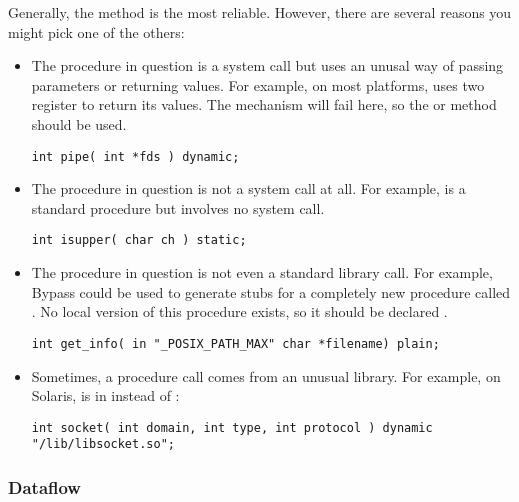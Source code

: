 Generally, the  method is the most reliable.  However, there are several reasons you might pick one of the others:
\begin{itemize}
\item The procedure in question is a system call but uses an unusal way of passing parameters or returning values.  For example, on most platforms,  uses two register to return its values.  The  mechanism will fail here, so the  or  method should be used.
\begin{verbatim}
int pipe( int *fds ) dynamic;
\end{verbatim}
\item The procedure in question is not a system call at all.  For example,  is a standard procedure but involves no system call.
\begin{verbatim}
int isupper( char ch ) static;
\end{verbatim}
\item The procedure in question is not even a standard library call.  For example, Bypass could be used to generate stubs for a completely new procedure called .  No local version of this procedure exists, so it should be declared .
\begin{verbatim}
int get_info( in "_POSIX_PATH_MAX" char *filename) plain;
\end{verbatim}
\item Sometimes, a procedure call comes from an unusual library.  For example, on Solaris,  is in  instead of :
\begin{verbatim}
int socket( int domain, int type, int protocol ) dynamic "/lib/libsocket.so";
\end{verbatim}
\end{itemize}


\subsubsection{Dataflow}

